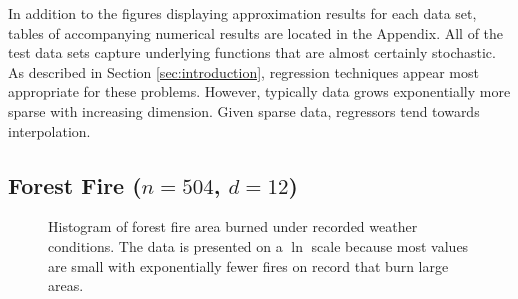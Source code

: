 \documentclass[smallextended,final]{svjour3}  %
\begin{document}
In addition to the figures displaying approximation results for each
data set, tables of accompanying numerical results are located in the
Appendix. All of the test data sets capture underlying functions that
are almost certainly stochastic. As described in Section
\ref{sec:introduction}, regression techniques appear most appropriate
for these problems. However, typically data grows exponentially more
sparse with increasing dimension. Given sparse data, regressors tend
towards interpolation.

\subsection{Forest Fire ($n = 504$, $d = 12$)}

\begin{figure}
  \centering
  \caption{Histogram of forest fire area burned under recorded weather
    conditions. The data is presented on a $\ln$ scale because
    most values are small with exponentially fewer fires on record
    that burn large areas.}
  \label{fig:hist-forest-fire}
\end{figure}
\end{document}
